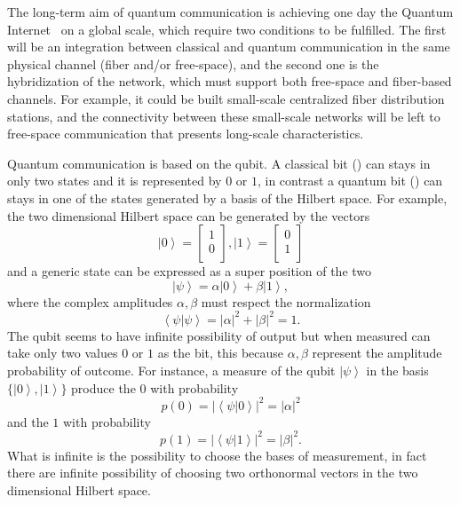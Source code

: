 The long-term aim of quantum communication is achieving one day the Quantum Internet~\cite{a19} on a global scale, which require two conditions to be fulfilled. The first will be an integration between classical and quantum communication in the same physical channel (fiber and/or free-space), and the second one is the hybridization of the network, which must support both free-space and fiber-based channels. For example, it could be built small-scale centralized fiber distribution stations, and the connectivity between these small-scale networks will be left to free-space communication that presents long-scale characteristics.


Quantum communication is based on the qubit. A classical bit () can stays in only two states and it is represented by $0$ or $1$, in contrast a quantum bit () can stays in one of the states generated by  a basis of the Hilbert space.
For example, the two dimensional Hilbert space can be generated by the vectors
\begin{equation}
  \left|0\right> = \begin{bmatrix} 1 \\ 0 \\ \end{bmatrix}, \left|1\right> = \begin{bmatrix} 0 \\ 1 \\ \end{bmatrix}
\end{equation}
and a generic state can be expressed as a super position of the two
\begin{equation}
  \left|\psi\right> = \alpha\left|0\right> + \beta\left|1\right>,
\end{equation}
where the complex amplitudes $\alpha, \beta$ must respect the normalization
\begin{equation}
  \left<\psi|\psi\right> = |\alpha|^2 + |\beta|^2 = 1.
\end{equation}
The qubit seems to have infinite possibility of output but when measured can take only two values $0$ or $1$ as the bit, this because $\alpha, \beta$ represent the amplitude probability of outcome. For instance, a measure of the qubit $\left|\psi\right>$ in the basis $\{\left|0\right>, \left|1\right>\}$ produce the $0$ with probability
\begin{equation}
  p(0) = |\left<\psi|0\right>|^2 = |\alpha|^2
\end{equation}
and the $1$ with probability
\begin{equation}
  p(1) = |\left<\psi|1\right>|^2 = |\beta|^2.
\end{equation}
What is infinite is the possibility to choose the bases of measurement, in fact there are infinite possibility of choosing two orthonormal vectors in the two dimensional Hilbert space.

